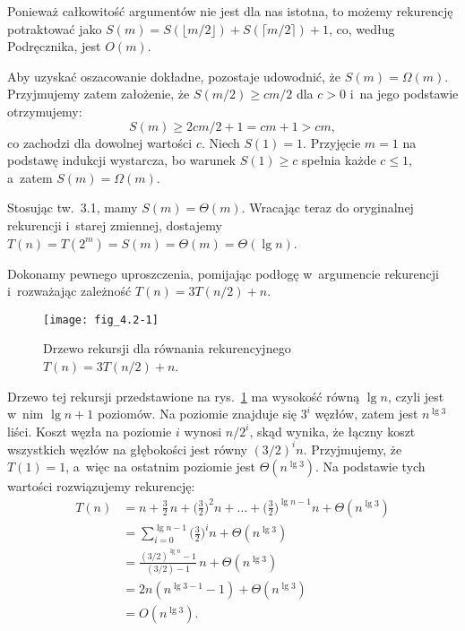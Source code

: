 Ponieważ całkowitość argumentów nie jest dla nas istotna, to możemy rekurencję potraktować jako $S(m)=S(\lfloor m/2\rfloor)+S(\lceil m/2\rceil)+1$, co, według Podręcznika, jest $O(m)$.

Aby uzyskać oszacowanie dokładne, pozostaje udowodnić, że $S(m)=\Omega(m)$.
Przyjmujemy zatem założenie, że $S(m/2)\ge cm/2$ dla $c>0$ i~na jego podstawie otrzymujemy:
\[
	S(m) \ge 2cm/2+1 = cm+1 > cm,
\]
co zachodzi dla dowolnej wartości $c$.
Niech $S(1)=1$.
Przyjęcie $m=1$ na podstawę indukcji wystarcza, bo warunek $S(1)\ge c$ spełnia każde $c\le1$, a~zatem $S(m)=\Omega(m)$.

Stosując tw.\ 3.1, mamy $S(m)=\Theta(m)$.
Wracając teraz do oryginalnej rekurencji i~starej zmiennej, dostajemy $T(n)=T(2^m)=S(m)=\Theta(m)=\Theta(\lg n)$.


\exercise %
Dokonamy pewnego uproszczenia, pomijając podłogę w~argumencie rekurencji i~rozważając zależność $T(n)=3T(n/2)+n$.
\begin{figure}[ht]
	\begin{center}
		\texttt{[image: fig\_4.2-1]}
	\end{center}
	\caption{Drzewo rekursji dla równania rekurencyjnego $T(n)=3T(n/2)+n$.} \label{fig:4.2-1}
\end{figure}
Drzewo tej rekursji przedstawione na rys.\ \ref{fig:4.2-1} ma wysokość równą $\lg n$, czyli jest w~nim $\lg n+1$ poziomów.
Na  poziomie znajduje się $3^i$ węzłów, zatem jest $n^{\lg3}$ liści.
Koszt węzła na poziomie $i$ wynosi $n/2^i$, skąd wynika, że łączny koszt wszystkich węzłów na  głębokości jest równy $(3/2)^in$.
Przyjmujemy, że $T(1)=1$, a~więc na ostatnim poziomie jest $\Theta(n^{\lg3})$.
Na podstawie tych wartości rozwiązujemy rekurencję:
\begin{align*}
	T(n) &= n+\frac{3}{2}\,n+\biggl(\frac{3}{2}\biggr)^2n+\dots+\biggl(\frac{3}{2}\biggr)^{\lg n-1}n+\Theta(n^{\lg3}) \\
	&= \sum_{i=0}^{\lg n-1}\biggl(\frac{3}{2}\biggr)^in+\Theta(n^{\lg3}) \\
	&= \frac{(3/2)^{\lg n}-1}{(3/2)-1}\,n+\Theta(n^{\lg3}) \\[1mm]
	&= 2n(n^{\lg3-1}-1)+\Theta(n^{\lg3}) \\
	&= O(n^{\lg3}).
\end{align*}

